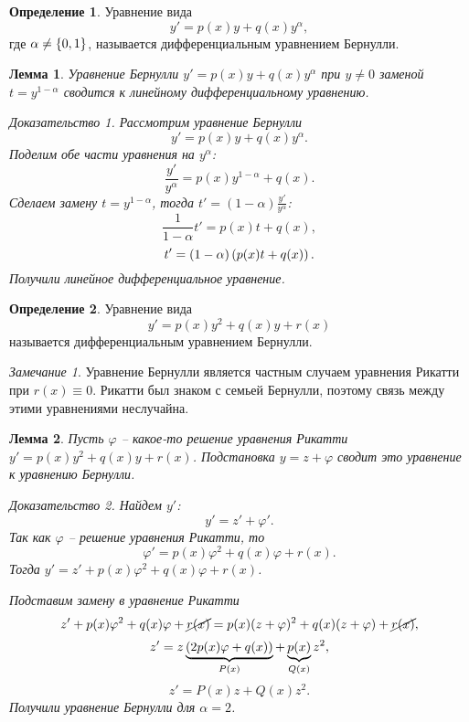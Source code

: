 \documentclass[a5paper, 10pt]{article}
\theoremstyle{definition}
\newtheorem{Def}{Определение}
\theoremstyle{plain}
\newtheorem{Lem}{Лемма}
\theoremstyle{remark}
\newtheorem*{Note}{Замечание}
\newtheorem*{Proof}{Доказательство}
\begin{document}
	\begin{Def}
		Уравнение вида 
		\begin{equation}
			y' = p(x) y + q(x) y^{\alpha},
		\end{equation}
		где $\alpha\neq \left\{0,1\right\}$, называется дифференциальным уравнением Бернулли.
	\end{Def}
	
	\begin{Lem}
		Уравнение Бернулли $y' = p(x) y + q(x) y^{\alpha}$ при $y\neq0$ заменой $t = y^{1-\alpha}$ сводится к линейному дифференциальному уравнению.
		\begin{Proof}
			Рассмотрим уравнение Бернулли 
			\[
			y' = p(x) y + q(x) y^{\alpha}.
			\]
			Поделим обе части уравнения на $y^{\alpha}$:
			\[
			\frac{y'}{y^\alpha} = p(x) y^{1-\alpha} + q(x).
			\]
			Сделаем замену $t = y^{1-\alpha}$, тогда $t' = (1-\alpha)\frac{y'}{y^{\alpha}}$:
			\[
			\frac{1}{1-\alpha} t' = p(x) t + q(x),
			\]
			\[
			t' = \left(1-\alpha\right)\left(p(x) t + q(x)\right).
			\]
			Получили линейное дифференциальное уравнение.
		\end{Proof}
	\end{Lem}
	
	\begin{Def}
		Уравнение вида 
		\begin{equation}
			y' = p(x) y^2 + q(x) y + r(x)
		\end{equation}
		называется дифференциальным уравнением Бернулли.
	\end{Def}
	\begin{Note}
		Уравнение Бернулли является частным случаем уравнения Рикатти при $r(x)\equiv 0$. Рикатти был знаком с семьей Бернулли, поэтому связь между этими уравнениями неслучайна.
	\end{Note}
	
	\begin{Lem}
		Пусть $\varphi$ -- какое-то решение уравнения Рикатти $y' = p(x) y^2 + q(x) y + r(x)$. Подстановка $y = z + \varphi$ сводит это уравнение к уравнению Бернулли.
		\begin{Proof}
			Найдем $y'$:
			\[
			y' = z' + \varphi'.
			\]
			Так как $\varphi$ -- решение уравнения Рикатти, то 
			\[
			\varphi' = p(x) \varphi^2 + q(x) \varphi + r(x).
			\]
			Тогда $y' = z' + p(x) \varphi^2 + q(x) \varphi + r(x)$.
			
			Подставим замену в уравнение Рикатти
			\[
				z' + p(x) \varphi^2 + q(x) \varphi + \cancel{r(x)} = p(x) (z+\varphi)^2 + q(x) (z+\varphi) + \cancel{r(x)},
			\]
			\[
				z' = z \underbrace{\left(2p(x)\varphi + q(x)\right)}_{P(x)} + \underbrace{p(x)}_{Q(x)} z^2,
			\]
			\[
				z' = P(x) z + Q(x) z^2.
			\]
			Получили уравнение Бернулли для $\alpha=2$.
		\end{Proof}
	\end{Lem}
	
\end{document}
